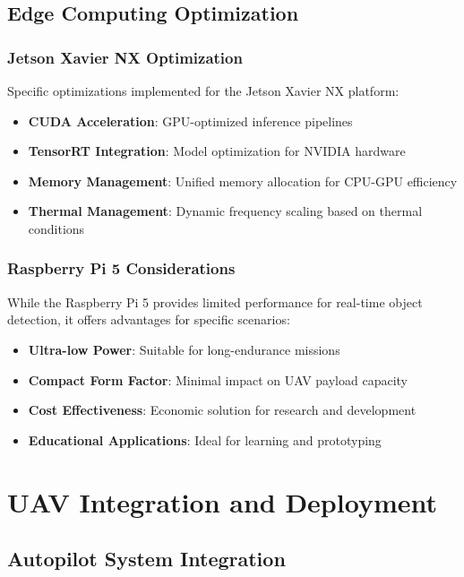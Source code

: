 \documentclass[12pt,a4paper]{article}
\begin{document}
\subsection{Edge Computing Optimization}

\subsubsection{Jetson Xavier NX Optimization}

Specific optimizations implemented for the Jetson Xavier NX platform:

\begin{itemize}
    \item \textbf{CUDA Acceleration}: GPU-optimized inference pipelines
    \item \textbf{TensorRT Integration}: Model optimization for NVIDIA hardware
    \item \textbf{Memory Management}: Unified memory allocation for CPU-GPU efficiency
    \item \textbf{Thermal Management}: Dynamic frequency scaling based on thermal conditions
\end{itemize}

\subsubsection{Raspberry Pi 5 Considerations}

While the Raspberry Pi 5 provides limited performance for real-time object detection, it offers advantages for specific scenarios:

\begin{itemize}
    \item \textbf{Ultra-low Power}: Suitable for long-endurance missions
    \item \textbf{Compact Form Factor}: Minimal impact on UAV payload capacity
    \item \textbf{Cost Effectiveness}: Economic solution for research and development
    \item \textbf{Educational Applications}: Ideal for learning and prototyping
\end{itemize}

\section{UAV Integration and Deployment}

\subsection{Autopilot System Integration}
\end{document}

